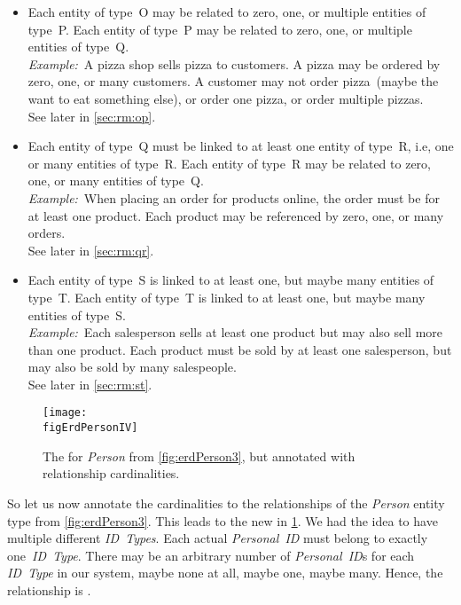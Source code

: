 \begin{itemize}
%
\item {}
Each entity of type~O may be related to zero, one, or multiple entities of type~P.
Each entity of type~P may be related to zero, one, or multiple entities of type~Q.\\%
\emph{Example:}~A pizza shop sells pizza to customers.
A pizza may be ordered by zero, one, or many customers.
A customer may not order pizza~(maybe the want to eat something else), or order one pizza, or order multiple pizzas.~\cite{FCC2016D:CFNRSAHTRD}\\%
See later in \cref{sec:rm:op}.%
%
\item {}
Each entity of type~Q must be linked to at least one entity of type~R, i.e, one or many entities of type~R.
Each entity of type~R may be related to zero, one, or many entities of type~Q.~\cite{BS2023G:CFNIERD}\\%
\emph{Example:}~When placing an order for products online, the order must be for at least one product.
Each product may be referenced by zero, one, or many orders.~\cite{BS2023G:CFNIERD}\\%
See later in \cref{sec:rm:qr}.%
%
\item {}
Each entity of type~S is linked to at least one, but maybe many entities of type~T.
Each entity of type~T is linked to at least one, but maybe many entities of type~S.~\cite{T2025CDBMS:ERM}\\%
\emph{Example:}~Each salesperson sells at least one product but may also sell more than one product.
Each product must be sold by at least one salesperson, but may also be sold by many salespeople.~\cite{T2025CDBMS:ERM}\\%
See later in \cref{sec:rm:st}.%
%
\end{itemize}%
%
\FloatBarrier%
%
\begin{figure}%
\centering%
\xdef\figErdPersonIV{\currentDir/erdPerson4}%
\texttt{[image: \\figErdPersonIV]}%
\caption{The  for \emph{Person} from \cref{fig:erdPerson3}, but annotated with relationship cardinalities.}%
\label{fig:erdPerson4}%
\end{figure}%

So let us now annotate the cardinalities to the relationships of the \emph{Person} entity type from \cref{fig:erdPerson3}.
This leads to the new  in \cref{fig:erdPerson4}.
We had the idea to have multiple different \emph{ID~Types}.
Each actual \emph{Personal~ID} must belong to exactly one~\emph{ID~Type}.
There may be an arbitrary number of \emph{Personal~ID}s for each \emph{ID~Type} in our system, maybe none at all, maybe one, maybe many.
Hence, the relationship is .

